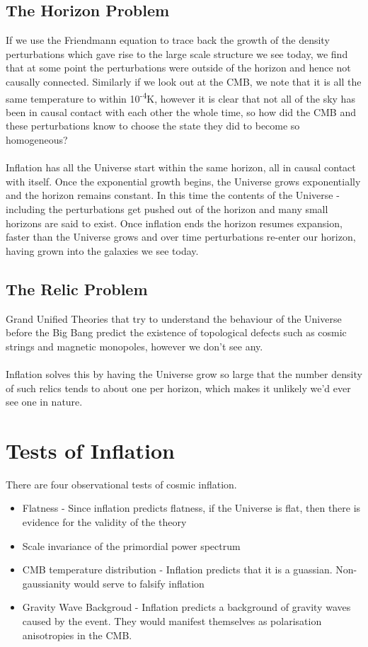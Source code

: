 \documentclass[12pt]{report}
\begin{document}
\begin{itemize}
\subsection{The Horizon Problem}
If we use the Friendmann equation to trace back the growth of the density perturbations which gave rise to the large scale structure we see today, we find that at some point the perturbations were outside of the horizon and hence not causally connected. Similarly if we look out at the CMB, we note that it is all the same temperature to within 10\textsuperscript{-4}K, however it is clear that not all of the sky has been in causal contact with each other the whole time, so how did the CMB and these perturbations know to choose the state they did to become so homogeneous?
\\\\
Inflation has all the Universe start within the same horizon, all in causal contact with itself. Once the exponential growth begins, the Universe grows exponentially and the horizon remains constant. In this time the contents of the Universe - including the perturbations get pushed out of the horizon and many small horizons are said to exist. Once inflation ends the horizon resumes expansion, faster than the Universe grows and over time perturbations re-enter our horizon, having grown into the galaxies we see today.

\subsection{The Relic Problem}
Grand Unified Theories that try to understand the behaviour of the Universe before the Big Bang predict the existence of topological defects such as cosmic strings and magnetic monopoles, however we don't see any.
\\\\
Inflation solves this by having the Universe grow so large that the number density of such relics tends to about one per horizon, which makes it unlikely we'd ever see one in nature.

\section{Tests of Inflation}
There are four observational tests of cosmic inflation.
\begin{itemize}
\item Flatness - Since inflation predicts flatness, if the Universe is flat, then there is evidence for the validity of the theory
\item Scale invariance of the primordial power spectrum
\item CMB temperature distribution - Inflation predicts that it is a guassian. Non-gaussianity would serve to falsify inflation
\item Gravity Wave Backgroud - Inflation predicts a background of gravity waves caused by the event. They would manifest themselves as polarisation anisotropies in the CMB.
\end{itemize}


\end{itemize}
\end{document}
